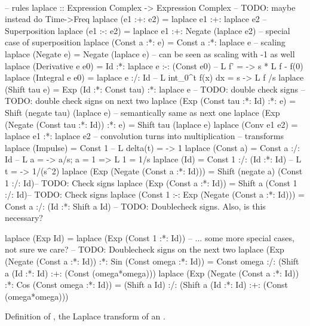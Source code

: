 \begin{codefig}
 ~\\
\begin{code}
-- rules
laplace :: Expression Complex -> Expression Complex -- TODO: maybe instead do Time->Freq
laplace (e1 :+: e2) = laplace e1 :+: laplace e2 -- Superposition
laplace (e1 :-: e2) = laplace e1 :+: Negate (laplace e2) -- special case of superposition
laplace (Const a :*: e) = Const a :*: laplace e -- scaling
laplace (Negate e) = Negate (laplace e) -- can be seen as scaling with -1 as well
laplace (Derivative e e0) = Id :*: laplace e :-: (Const e0) -- L {f'} = \s -> s * L {f} - f(0)
laplace (Integral e e0) = laplace e :/: Id -- L {int_0^t f(x) dx} = s -> L {f} /s 
laplace (Shift tau e) = Exp (Id :*: Const tau) :*: laplace e -- TODO: double check signs
  -- TODO: double check signs on next two
laplace (Exp (Const tau :*: Id) :*: e) = Shift (negate tau) (laplace e) -- semantically same as next one
laplace (Exp (Negate (Const tau :*: Id)) :*: e) = Shift tau (laplace e)
laplace (Conv e1 e2) = laplace e1 :*: laplace e2 -- convolution turns into multiplication
-- transforms
laplace (Impulse) = Const 1 -- L {delta(t)} = \s -> 1
laplace (Const a) = Const a :/: Id -- L {a} = \s -> a/s; a = 1 => L {1} = 1/s
laplace (Id)      = Const 1 :/: (Id :*: Id) -- L {t} = \s -> 1/(s^2)
laplace (Exp (Negate (Const a :*: Id))) = Shift (negate a) (Const 1 :/: Id)-- TODO: Check signs
laplace (Exp (Const a :*: Id)) = Shift a (Const 1 :/: Id)-- TODO: Check signs
laplace (Const 1 :-: Exp (Negate (Const a :*: Id))) = Const a :/: (Id :*: Shift a Id) -- TODO: Doublecheck signs. Also, is this necessary?

laplace (Exp Id) = laplace (Exp (Const 1 :*: Id))
-- ... some more special cases, not sure we care?
-- TODO: Doublecheck signs on the next two
laplace (Exp (Negate (Const a :*: Id)) :*: Sin (Const omega :*: Id)) = 
  Const omega :/: (Shift a (Id :*: Id) :+: (Const (omega*omega)))
laplace (Exp (Negate (Const a :*: Id)) :*: Cos (Const omega :*: Id)) = 
  (Shift a Id) :/: (Shift a (Id :*: Id) :+: (Const (omega*omega)))
\end{code}
\caption{Definition of , the Laplace transform of an .}\label{code:laplace-def}
\end{codefig}

